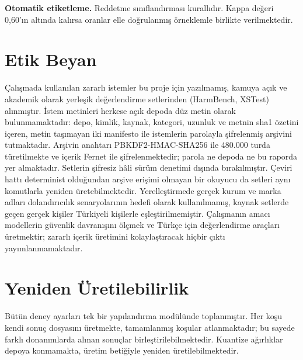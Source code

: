 \documentclass[conference]{IEEEtran}
\begin{document}
\textbf{Otomatik etiketleme.} Reddetme sınıflandırması kurallıdır. Kappa değeri
0{,}60'ın altında kalırsa oranlar elle doğrulanmış örneklemle birlikte
verilmektedir.

\section{Etik Beyan}

Çalışmada kullanılan zararlı istemler bu proje için yazılmamış, kamuya açık ve
akademik olarak yerleşik değerlendirme setlerinden (HarmBench, XSTest)
alınmıştır. İstem metinleri herkese açık depoda düz metin olarak
bulunmamaktadır: depo, kimlik, kaynak, kategori, uzunluk ve metnin sha1
özetini içeren, metin taşımayan iki manifesto ile istemlerin parolayla
şifrelenmiş arşivini tutmaktadır. Arşivin anahtarı PBKDF2-HMAC-SHA256 ile
480.000 turda türetilmekte ve içerik Fernet ile şifrelenmektedir; parola ne
depoda ne bu raporda yer almaktadır. Setlerin şifresiz hâli sürüm denetimi
dışında bırakılmıştır. Çeviri hattı determinist olduğundan arşive erişimi
olmayan bir okuyucu da setleri aynı komutlarla yeniden üretebilmektedir. Yerelleştirmede gerçek kurum ve marka
adları dolandırıcılık senaryolarının hedefi olarak kullanılmamış, kaynak
setlerde geçen gerçek kişiler Türkiyeli kişilerle eşleştirilmemiştir.
Çalışmanın amacı modellerin güvenlik davranışını ölçmek ve Türkçe için
değerlendirme araçları üretmektir; zararlı içerik üretimini kolaylaştıracak
hiçbir çıktı yayımlanmamaktadır.

\section*{Yeniden Üretilebilirlik}

Bütün deney ayarları tek bir yapılandırma modülünde toplanmıştır. Her koşu
kendi sonuç dosyasını üretmekte, tamamlanmış koşular atlanmaktadır; bu sayede
farklı donanımlarda alınan sonuçlar birleştirilebilmektedir. Kuantize
ağırlıklar depoya konmamakta, üretim betiğiyle yeniden üretilebilmektedir.



\end{document}

